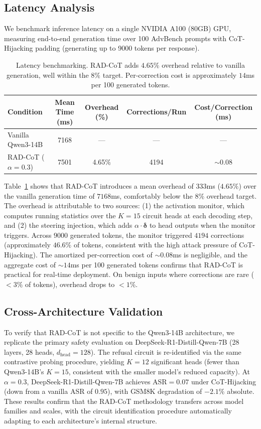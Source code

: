 \documentclass[11pt]{article}
\begin{document}
\subsection{Latency Analysis}
\label{sec:latency}

We benchmark inference latency on a single NVIDIA A100 (80GB) GPU, measuring end-to-end generation time over 100 AdvBench prompts with CoT-Hijacking padding (generating up to 9000 tokens per response).

\begin{table}[t]
\centering
\caption{Latency benchmarking. RAD-CoT adds $4.65\%$ overhead relative to vanilla generation, well within the $8\%$ target. Per-correction cost is approximately $14$ms per 100 generated tokens.}
\label{tab:latency}
\begin{tabular}{lcccc}
\toprule
\textbf{Condition} & \textbf{Mean Time (ms)} & \textbf{Overhead (\%)} & \textbf{Corrections/Run} & \textbf{Cost/Correction (ms)} \\
\midrule
Vanilla Qwen3-14B & 7168 & --- & --- & --- \\
RAD-CoT ($\alpha{=}0.3$) & 7501 & 4.65\% & 4194 & $\sim$0.08 \\
\bottomrule
\end{tabular}
\end{table}

Table~\ref{tab:latency} shows that RAD-CoT introduces a mean overhead of $333$ms ($4.65\%$) over the vanilla generation time of $7168$ms, comfortably below the $8\%$ overhead target. The overhead is attributable to two sources: (1) the activation monitor, which computes running statistics over the $K{=}15$ circuit heads at each decoding step, and (2) the steering injection, which adds $\alpha \cdot \boldsymbol{\delta}$ to head outputs when the monitor triggers. Across $9000$ generated tokens, the monitor triggered $4194$ corrections (approximately $46.6\%$ of tokens, consistent with the high attack pressure of CoT-Hijacking). The amortized per-correction cost of $\sim 0.08$ms is negligible, and the aggregate cost of $\sim 14$ms per 100 generated tokens confirms that RAD-CoT is practical for real-time deployment. On benign inputs where corrections are rare ($<3\%$ of tokens), overhead drops to $< 1\%$.

\subsection{Cross-Architecture Validation}

To verify that RAD-CoT is not specific to the Qwen3-14B architecture, we replicate the primary safety evaluation on DeepSeek-R1-Distill-Qwen-7B (28 layers, 28 heads, $d_{\text{head}}{=}128$). The refusal circuit is re-identified via the same contrastive probing procedure, yielding $K{=}12$ significant heads (fewer than Qwen3-14B's $K{=}15$, consistent with the smaller model's reduced capacity). At $\alpha{=}0.3$, DeepSeek-R1-Distill-Qwen-7B achieves ASR${}=0.07$ under CoT-Hijacking (down from a vanilla ASR of $0.95$), with GSM8K degradation of $-2.1\%$ absolute. These results confirm that the RAD-CoT methodology transfers across model families and scales, with the circuit identification procedure automatically adapting to each architecture's internal structure.
\end{document}
